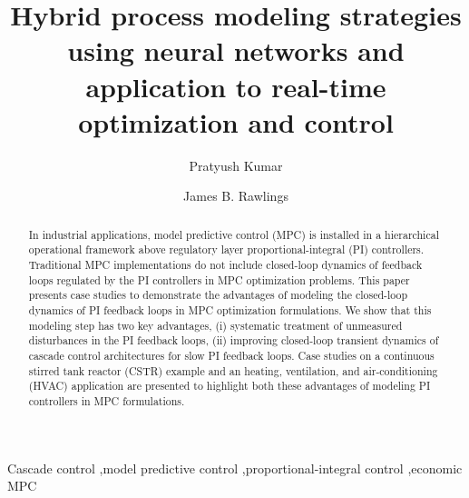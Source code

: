 \documentclass[preprint,5p, twocolumn, authoryear]{elsarticle}
\begin{document}
\begin{frontmatter}


\title{Hybrid process modeling strategies using neural networks and
application to real-time optimization and control}

\author[label1]{Pratyush Kumar}

\author[label1]{James B. Rawlings}

\address[label1]{Department of Chemical Engineering, University of California,
        Santa Barbara, CA 93106, United States} 
                
\begin{abstract}

In industrial applications, model predictive control (MPC) is installed in a
hierarchical operational framework above regulatory layer proportional-integral
(PI) controllers. Traditional MPC implementations do not include closed-loop
dynamics of feedback loops regulated by the PI controllers in MPC optimization
problems. This paper presents case studies to demonstrate the advantages of
modeling the closed-loop dynamics of PI feedback loops in MPC optimization
formulations. We show that this modeling step has two key advantages, (i)
systematic treatment of unmeasured disturbances in the PI feedback loops, (ii)
improving closed-loop transient dynamics of cascade control architectures for
slow PI feedback loops. Case studies on a continuous stirred tank reactor (CSTR)
example and an heating, ventilation, and air-conditioning (HVAC) application are
presented to highlight both these advantages of modeling PI controllers in MPC
formulations. 

\end{abstract}

\begin{keyword}
Cascade control \sep model predictive control \sep proportional-integral control
\sep economic MPC
\end{keyword}

\end{frontmatter}
\end{document}
